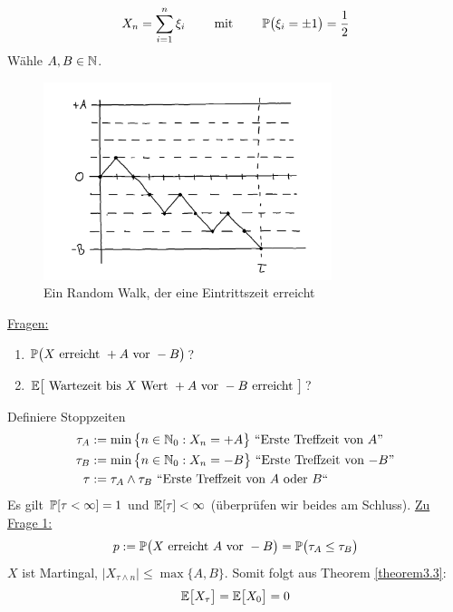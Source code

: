 \begin{beisp}
\begin{align*}
X_n=\sum\limits_{i=1}^n \xi_i\qquad\mit\qquad \P\big(\xi_i=\pm 1\big)=\frac{1}{2}
\end{align*}
Wähle $A,B\in\N$.
\begin{figure}[h!]
	\center
	\includegraphics[width=0.75\textwidth]{./pics/Sketch0.png}
	\caption{Ein Random Walk, der eine Eintrittszeit erreicht}
	\label{AbbEintrittszeit}
\end{figure}
\enter
\underline{Fragen:} 
\begin{enumerate}
\item $\P\big( X\text{ erreicht }+A\text{ vor }-B\big)$?
\item $\E\big[\text{ Wartezeit bis }X\text{ Wert }+A\text{ vor }-B\text{ erreicht }\big]$?
\end{enumerate}
Definiere Stoppzeiten 
\begin{align*}
\tau_A&:=\min\big\lbrace n\in\N_0:X_n=+A\big\rbrace\text{ ``Erste Treffzeit von $A$''}\\
\tau_B&:=\min\big\lbrace n\in\N_0:X_n=-B\big\rbrace\text{ ``Erste Treffzeit von $-B$''}\\
\tau&:=\tau_A\wedge\tau_B\text{ ``Erste Treffzeit von $A$ oder $B$``}
\end{align*}
Es gilt $\P[\tau<\infty]=1$  und $\E[\tau]<\infty$ (überprüfen wir beides am Schluss).\nl
\underline{Zu Frage 1:}
\begin{align*}
p:=\P\big( X\text{ erreicht }A\text{ vor }-B\big)=\P\big(\tau_A\leq\tau_B\big)
\end{align*}
$X$ ist Martingal, $\big|X_{\tau\wedge n}\big|\leq\max\lbrace A,B\rbrace$. Somit folgt aus Theorem \ref{theorem3.3}:
\begin{align*}
\E\big[X_\tau\big]=\E\big[X_0\big]=0
\end{align*}

\end{beisp}
